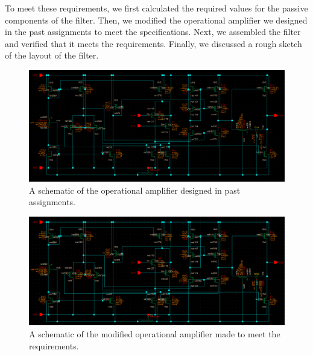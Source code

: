 \documentclass[journal,hidelinks]{IEEEtran}
\begin{document}
To meet these requirements, we first calculated the required values for the passive components of the filter. Then, we modified the operational amplifier we designed in the past assignments to meet the specifications. Next, we assembled the filter and verified that it meets the requirements. Finally, we discussed a rough sketch of the layout of the filter.

\begin{figure}[!htb]
  \centering
  \includegraphics[width=\textwidth]{schematics/folded_cascode.png}
  \caption{A schematic of the operational amplifier designed in past assignments.}
  \label{fig:folded_cascode}
\end{figure}

\begin{figure}[!htb]
  \centering
  \includegraphics[width=\textwidth]{schematics/folded_cascode_2.png}
  \caption{A schematic of the modified operational amplifier made to meet the requirements.}
  \label{fig:folded_cascode_2}
\end{figure}
\end{document}
